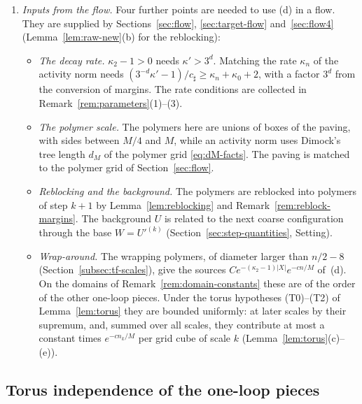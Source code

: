 \begin{remark}
\begin{enumerate}[label=(\alph*)]
\item \emph{Inputs from the flow.} Four further points are needed to use (d) in a flow. They are supplied by Sections~\ref{sec:flow}, \ref{sec:target-flow} and~\ref{sec:flow4} (Lemma~\ref{lem:raw-new}(b) for the reblocking):
  \begin{itemize}
  \item \emph{The decay rate.} $\kappa_2-1>0$ needs $\kappa'>3^d$. Matching the rate $\kappa_n$ of the activity norm needs $(3^{-d}\kappa'-1)/c_\sharp\ge\kappa_n+\kappa_0+2$, with a factor $3^d$ from the conversion of margins. The rate conditions are collected in Remark~\ref{rem:parameters}(1)--(3).
  \item \emph{The polymer scale.} The polymers here are unions of boxes of the paving, with sides between $M/4$ and $M$, while an activity norm uses Dimock's tree length $d_M$ of the polymer grid \eqref{eq:dM-facts}. The paving is matched to the polymer grid of Section~\ref{sec:flow}.
  \item \emph{Reblocking and the background.} The polymers are reblocked into polymers of step $k+1$ by Lemma~\ref{lem:reblocking} and Remark~\ref{rem:reblock-margins}. The background $U$ is related to the next coarse configuration through the base $W=U'^{(k)}$ (Section~\ref{sec:step-quantities}, Setting).
  \item \emph{Wrap-around.} The wrapping polymers, of diameter larger than $n/2-8$ (Section~\ref{subsec:tf-scales}), give the sources $Ce^{-(\kappa_2-1)|X|}e^{-cn/M}$ of~(d). On the domains of Remark~\ref{rem:domain-constants} these are of the order of the other one-loop pieces. Under the torus hypotheses (T0)--(T2) of Lemma~\ref{lem:torus} they are bounded uniformly: at later scales by their supremum, and, summed over all scales, they contribute at most a constant times $e^{-cn_k/M}$ per grid cube of scale $k$ (Lemma~\ref{lem:torus}(c)--(e)).
  \end{itemize}
\end{enumerate}
\end{remark}

\subsection{Torus independence of the one-loop pieces}\label{subsec:torus-independence}


